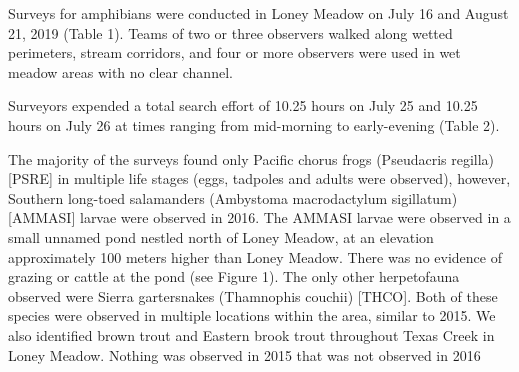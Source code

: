 \documentclass[11pt,a4paper,]{article}
\begin{document}
Surveys for amphibians were conducted in Loney Meadow on July 16 and August 21, 2019 (Table 1). Teams of two or three observers walked along wetted perimeters, stream corridors, and four or more observers were used in wet meadow areas with no clear channel.

Surveyors expended a total search effort of 10.25 hours on July 25 and 10.25 hours on July 26 at times ranging from mid-morning to early-evening (Table 2).

The majority of the surveys found only Pacific chorus frogs (Pseudacris regilla) {[}PSRE{]} in multiple life stages (eggs, tadpoles and adults were observed), however, Southern long-toed salamanders (Ambystoma macrodactylum sigillatum) {[}AMMASI{]} larvae were observed in 2016. The AMMASI larvae were observed in a small unnamed pond nestled north of Loney Meadow, at an elevation approximately 100 meters higher than Loney Meadow. There was no evidence of grazing or cattle at the pond (see Figure 1). The only other herpetofauna observed were Sierra gartersnakes (Thamnophis couchii) {[}THCO{]}. Both of these species were observed in multiple locations within the area, similar to 2015. We also identified brown trout and Eastern brook trout throughout Texas Creek in Loney Meadow. Nothing was observed in 2015 that was not observed in 2016

\printbibliography
\end{document}
